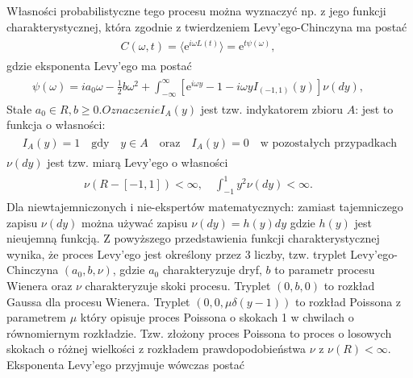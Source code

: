 \documentclass[a4paper,12pt,polish]{sphinxmanual}
\begin{document}
Własności probabilistyczne tego procesu można wyznaczyć np. z jego funkcji charakterystycznej, która zgodnie z twierdzeniem Levy'ego-Chinczyna ma postać
\label{ch3/chIII021:equation-eqn51}\begin{gather}
\begin{split}C(\omega, t) = \langle \mbox{e}^{i\omega L(t)} \rangle = \mbox{e}^{t \psi(\omega)}, \qquad\end{split}\label{ch3/chIII021-eqn51}
\end{gather}
gdzie eksponenta Levy'ego ma postać
\label{ch3/chIII021:equation-eqn52}\begin{gather}
\begin{split}\psi(\omega) = ia_0 \omega -\frac{1}{2} b \omega^2+\int_{-\infty}^{\infty} \left[\mbox{e}^{i\omega y} - 1 - i\omega y I_{(-1,1)}(y) \right] \nu (dy), \qquad\end{split}\label{ch3/chIII021-eqn52}
\end{gather}
Stałe $a_0\in R, b \ge 0. Oznaczenie I_A(y)$ jest tzw. indykatorem zbioru $A$: jest to funkcja o własności:
\label{ch3/chIII021:equation-eqn53}\begin{gather}
\begin{split} I_A(y) =1 \quad \mbox{gdy} \quad y\in A \quad \mbox{oraz} \quad I_A(y) = 0 \quad \mbox{w pozostałych przypadkach}\end{split}\label{ch3/chIII021-eqn53}
\end{gather}
$\nu(dy)$ jest tzw. miarą Levy'ego o własności
\label{ch3/chIII021:equation-eqn54}\begin{gather}
\begin{split}\nu (R-[-1, 1]) < \infty, \quad \int_{-1}^1 y^2 \nu(dy) < \infty. \qquad\end{split}\label{ch3/chIII021-eqn54}
\end{gather}
Dla niewtajemniczonych i nie-ekspertów matematycznych: zamiast tajemniczego zapisu $\nu(dy)$ można używać zapisu $\nu(dy) = h(y) dy$ gdzie $h(y)$ jest nieujemną funkcją. Z powyższego przedstawienia funkcji charakterystycznej wynika, że proces Levy'ego jest określony przez 3 liczby, tzw. tryplet Levy'ego-Chinczyna $(a_0, b, \nu)$, gdzie $a_0$ charakteryzuje dryf, $b$ to parametr procesu Wienera oraz $\nu$ charakteryzuje skoki procesu. Tryplet $(0, b, 0)$ to rozkład Gaussa dla procesu Wienera. Tryplet $(0, 0, \mu \delta(y-1))$ to rozkład Poissona z parametrem $\mu$ który opisuje proces Poissona o skokach 1 w chwilach o równomiernym rozkładzie. Tzw. złożony proces Poissona to proces o losowych skokach o różnej wielkości z rozkładem prawdopodobieństwa $\nu$ z $\nu(R) <\infty$. Eksponenta Levy'ego przyjmuje wówczas postać
\end{document}
